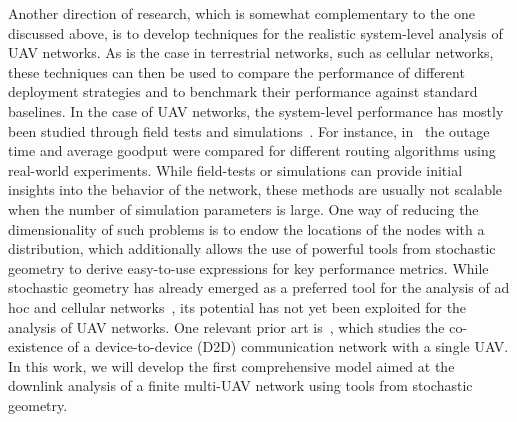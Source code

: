 \documentclass[journal,draftclsnofoot,onecolumn,12pt]{IEEEtran}
\begin{document}
Another direction of research, which is somewhat complementary to the one discussed above, is to develop techniques for the realistic system-level analysis of UAV networks. As is the case in terrestrial networks, such as cellular networks, these techniques can then be used to compare the performance of different deployment strategies and to benchmark their performance against standard baselines. In the case of UAV networks, the system-level performance has mostly been studied through field tests and simulations~\cite{ft1,ft2,ft3}. For instance, in~\cite{ft2} the outage time and average goodput were compared for different routing algorithms using real-world experiments. While field-tests or simulations can provide initial insights into the behavior of the network, these methods are usually not scalable when the number of simulation parameters is large. One way of reducing the dimensionality of such problems is to endow the locations of the nodes with a distribution, which additionally allows the use of powerful tools from stochastic geometry to derive easy-to-use expressions for key performance metrics. While stochastic geometry has already emerged as a preferred tool for the analysis of ad hoc and cellular networks~\cite{tutorial_jeff}, its potential has not yet been exploited for the analysis of UAV networks. One relevant prior art is~\cite{uavd2d}, which studies the co-existence of a device-to-device (D2D) communication network with a single UAV. In this work, we will develop the first comprehensive model aimed at the downlink analysis of a finite multi-UAV network using tools from stochastic geometry. 
\end{document}
